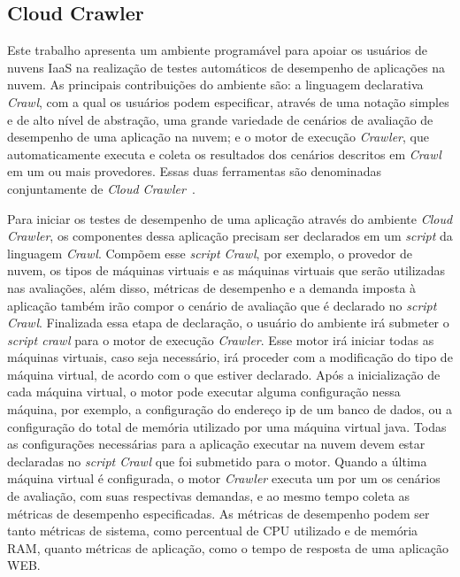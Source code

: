 
\subsection{Cloud Crawler}
Este trabalho apresenta um ambiente programável para apoiar os usuários de nuvens IaaS na realização de testes automáticos de desempenho de aplicações na nuvem. As principais contribuições do ambiente são: a linguagem declarativa {\em Crawl}, com a qual os usuários podem especificar, através de uma notação simples e de alto nível de abstração, uma grande variedade de cenários de avaliação de desempenho de uma aplicação na nuvem; e o motor de execução {\em Crawler}, que automaticamente executa e coleta os resultados dos cenários descritos em {\em Crawl} em um ou mais provedores. Essas duas ferramentas são denominadas conjuntamente de {\em Cloud Crawler}~\cite{cunhacloud}.

Para iniciar os testes de desempenho de uma aplicação através do ambiente {\em Cloud Crawler}, os componentes dessa aplicação precisam ser declarados em um \textit{script} da linguagem {\em Crawl}. Compõem esse \textit{script Crawl}, por exemplo, o provedor de nuvem, os tipos de máquinas virtuais e as máquinas virtuais que serão utilizadas nas avaliações, além disso, métricas de desempenho e a demanda imposta à aplicação também irão compor o cenário de avaliação que é declarado no \textit{script Crawl}. Finalizada essa etapa de declaração, o usuário do ambiente irá submeter o \textit{script crawl} para o motor de execução {\em Crawler}. Esse motor irá iniciar todas as máquinas virtuais, caso seja necessário, irá proceder com a modificação do tipo de máquina virtual, de acordo com o que estiver declarado. Após a inicialização de cada máquina virtual, o motor pode executar alguma configuração nessa máquina, por exemplo, a configuração do endereço ip de um banco de dados, ou a configuração do total de memória utilizado por uma máquina virtual java. Todas as configurações necessárias para a aplicação executar na nuvem devem estar declaradas no {\em script Crawl} que foi submetido para o motor. Quando a última máquina virtual é configurada, o motor {\em Crawler} executa um por um os cenários de avaliação, com suas respectivas demandas, e ao mesmo tempo coleta as métricas de desempenho especificadas. As métricas de desempenho podem ser tanto métricas de sistema, como percentual de CPU utilizado e de memória RAM, quanto métricas de aplicação, como o tempo de resposta de uma aplicação WEB.

